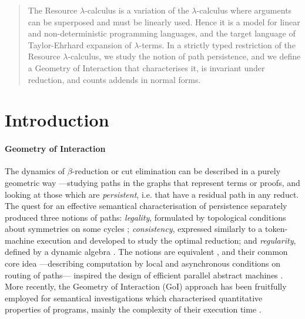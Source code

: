 \maketitle



\begin{abstract}
The Resource $\lambda$-calculus is a variation of the $\lambda$-calculus 
where arguments can be superposed and must be linearly used.
Hence it is a model for linear and non-deterministic programming languages, 
and the target language of Taylor-Ehrhard expansion of $\lambda$-terms.
In a strictly typed restriction of the  Resource $\lambda$-calculus, we study 
the notion of path persistence,
and we define a Geometry of Interaction that characterises it,
is invariant under reduction,
and counts addends in normal forms.
\end{abstract}

\section*{Introduction}

\paragraph{Geometry of Interaction}
The dynamics of $\beta$-reduction or cut elimination can be described in a 
purely geometric way ---studying paths in the graphs that represent terms 
or proofs, and looking at those which are \textit{persistent}, i.e. that have a 
residual path in any reduct.
The quest for an effective semantical characterisation of persistence 
separately produced three notions of paths:
\textit{legality}, formulated by topological conditions about symmetries on 
some 
cycles \cite{AspertiLaneve:1995:TCS};
\textit{consistency}, expressed similarly to a token-machine execution 
\cite{GonthierAbadiLevy:1992:optimal} and developed to study the optimal 
reduction;
and \textit{regularity}, defined by a dynamic algebra
\cite{Girard:1989, DanosRegnier:1995}.
The notions are equivalent \cite{AspertiDanosLaneveRegnier:1994}, and their
common core idea ---describing computation by local and asynchronous 
conditions on routing of paths--- inspired the design of efficient parallel 
abstract machines 
\cite[for instance]{Mackie:1995, Pinto:2001}.
More recently, the Geometry of Interaction (GoI) approach has been fruitfully 
employed for semantical investigations which characterised quantitative 
properties of programs, mainly the complexity of their execution time 
\cite{DalLago:2009}.

